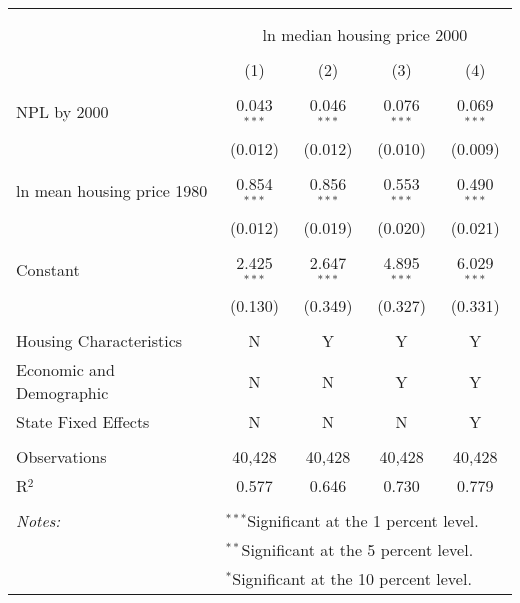 
\begin{table}[!htbp] \centering 
  \caption{} 
  \label{} 
\begin{tabular}{@{\extracolsep{5pt}}lcccc} 
\\[-1.8ex]\hline 
\hline \\[-1.8ex] 
\\[-1.8ex] & \multicolumn{4}{c}{ln median housing price 2000} \\ 
\\[-1.8ex] & (1) & (2) & (3) & (4)\\ 
\hline \\[-1.8ex] 
 NPL by 2000 & 0.043$^{***}$ & 0.046$^{***}$ & 0.076$^{***}$ & 0.069$^{***}$ \\ 
  & (0.012) & (0.012) & (0.010) & (0.009) \\ 
  & & & & \\ 
 ln mean housing price 1980 & 0.854$^{***}$ & 0.856$^{***}$ & 0.553$^{***}$ & 0.490$^{***}$ \\ 
  & (0.012) & (0.019) & (0.020) & (0.021) \\ 
  & & & & \\ 
 Constant & 2.425$^{***}$ & 2.647$^{***}$ & 4.895$^{***}$ & 6.029$^{***}$ \\ 
  & (0.130) & (0.349) & (0.327) & (0.331) \\ 
  & & & & \\ 
Housing Characteristics & N & Y & Y & Y \\ 
Economic and Demographic & N & N & Y & Y \\ 
State Fixed Effects & N & N & N & Y \\ 
 &  &  &  &  \\ 
Observations & 40,428 & 40,428 & 40,428 & 40,428 \\ 
R$^{2}$ & 0.577 & 0.646 & 0.730 & 0.779 \\ 
\hline \\[-1.8ex] 
\textit{Notes:} & \multicolumn{4}{l}{$^{***}$Significant at the 1 percent level.} \\ 
 & \multicolumn{4}{l}{$^{**}$Significant at the 5 percent level.} \\ 
 & \multicolumn{4}{l}{$^{*}$Significant at the 10 percent level.} \\ 
\end{tabular} 
\end{table} 
